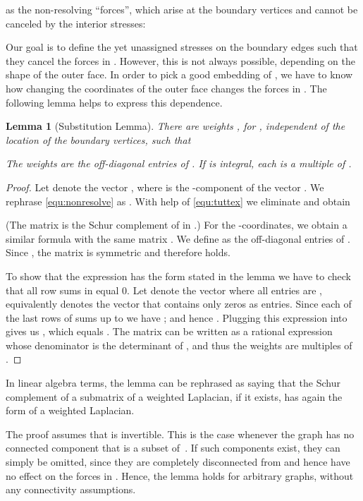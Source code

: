 \documentclass{article}
\theoremstyle{plain} \newtheorem{thm}{Theorem}[section]
\newtheorem{lem}{Lemma}[section]
\begin{document}
as the non-resolving ``forces'', which arise at the boundary vertices and
cannot be canceled by the interior stresses:

Our goal is to define the yet unassigned stresses on the boundary
edges such that they cancel the forces in .  However, this is not
always possible, depending on the shape of the outer face.
In order to pick a good embedding of , we have to know how
changing the coordinates of the outer face changes the forces in .
The following lemma helps to express this dependence.

 

\begin{lem}[Substitution Lemma] \label{lemma:1}
There are  weights , for ,
 independent of the location of the boundary vertices, such that 
 
The weights  are the off-diagonal entries of  .
If  is integral,
each  is a  multiple of .
\end{lem}
\begin{proof}
Let  denote the vector , 
where  is the -component of the vector .
We rephrase \eqref{equ:nonresolve} as   
.
With help of \eqref{equ:tuttex} we eliminate  and 
obtain

(The matrix  is the Schur complement of  in .)
For the -coordinates, we obtain a similar formula with the same matrix . 
We define  as the off-diagonal entries  of
. Since , the matrix  is
symmetric and therefore  holds. 

To show that the expression
 has the form stated in the lemma we have
to check that all row sums in  equal 0. Let 
denote the vector  where all entries are , equivalently  denotes the vector that contains only zeros as entries. Since each of the last  rows of  sums up to  we have ; and hence 
. Plugging this
  expression into
   gives us 
, which equals
. 
The matrix  can be written as a rational expression whose
denominator is the determinant of , and thus the
weights  are multiples of .
\end{proof}

In linear algebra terms, the lemma can be rephrased as saying that the
Schur complement of a submatrix of a weighted Laplacian, if it exists,
has again the form of a weighted Laplacian.

The proof assumes that  is invertible. This is the case
whenever the graph  has no connected component that is a subset
of~. If such components exist, they can simply be omitted, since
they are completely disconnected from  and hence have no effect on
the forces in . Hence, the lemma holds for arbitrary graphs, without any connectivity assumptions.
\end{document}
